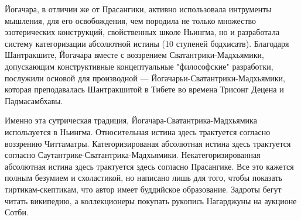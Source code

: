 Йогачара, в отличии же от Прасангики, активно использовала интрументы мышления, для его освобождения, чем породила не только множество эзотерических конструкций, свойственных школе Ньингма, но и разработала систему категоризации абсолютной истины (10 ступеней бодхисатв). Благодаря Шантракшите, Йогачара вместе с воззрением Сватантрики-Мадхьямики, допускающим конструктивные концептуальные "философские" разработки, послужили основой для производной — Йогачарьи-Сватантрики-Мадхьямики, которая преподавалась Шантракшитой в Тибете во времена Трисонг Децена и Падмасамбхавы.

Именно эта сутрическая традиция, Йогачара-Сватантрика-Мадхьямика используется в Ньингма. Относительная истина здесь трактуется согласно воззрению Читтаматры. Категоризированая абсолютная истина здесь трактуется согласно Саутантрике-Сватантрика-Мадхьямики. Некатегоризированная абсолютная истина здесь трактуется здесь согласно Прасангике. Все это кажется полным безумием и схоластикой, но написано лишь для того, чтобы показать тиртикам-скептикам, что автор имеет буддийское образование. Задроты бегут читать википедию, а коллекционеры покупать рукопись Нагарджуны на аукционе Сотби.

